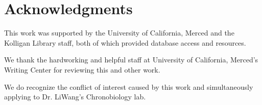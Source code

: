 \documentclass [12pt]{article}
\begin{document}
\section{Acknowledgments}
	\indent This work was supported by the University of California, Merced and the Kolligan Library staff, both of which provided database access and resources. \par
	\indent We thank the hardworking and helpful staff at University of California, Merced's Writing Center for reviewing this and other work. \par
	\indent We do recognize the conflict of interest caused by this work and simultaneously applying to Dr. LiWang's Chronobiology lab.
\newpage
\medskip %
\nocite{*} %
\printbibliography %
\end{document}
